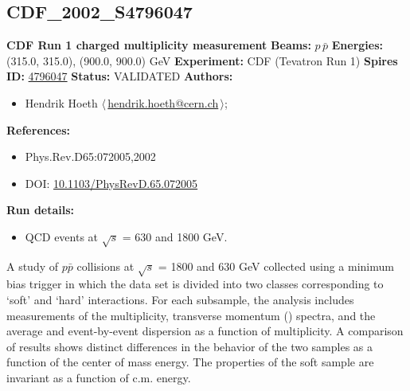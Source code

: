 \clearpage


\clearpage

\subsection[CDF\_2002\_S4796047]{CDF\_2002\_S4796047\,\cite{Acosta:2001rm}}
\textbf{CDF Run 1 charged multiplicity measurement}\newline
\textbf{Beams:} $p$\,$\bar{p}$ \newline
\textbf{Energies:} (315.0, 315.0), (900.0, 900.0) GeV \newline
\textbf{Experiment:} CDF (Tevatron Run 1) \newline
\textbf{Spires ID:} \href{http://www.slac.stanford.edu/spires/find/hep/www?rawcmd=key+4796047}{4796047}\newline
\textbf{Status:} VALIDATED\newline
\textbf{Authors:}
\begin{itemize}
  \item Hendrik Hoeth $\langle\,$\href{mailto:hendrik.hoeth@cern.ch}{hendrik.hoeth@cern.ch}$\,\rangle$;
\end{itemize}
\textbf{References:}
\begin{itemize}
  \item Phys.Rev.D65:072005,2002
  \item DOI: \href{http://dx.doi.org/10.1103/PhysRevD.65.072005}{10.1103/PhysRevD.65.072005}
\end{itemize}
\textbf{Run details:}
\begin{itemize}

  \item QCD events at \ensuremath{\sqrt{s}} = 630 and 1800 GeV.\end{itemize}

\noindent A study of $p\bar{p}$ collisions at \ensuremath{\sqrt{s}} = 1800 and 630 GeV collected using a minimum bias trigger in which the data set is divided into two classes corresponding to `soft' and `hard' interactions. For each subsample, the analysis includes measurements of the multiplicity, transverse momentum (\pT) spectra, and the average \pT and event-by-event \pT dispersion as a function of multiplicity. A comparison of results shows distinct differences in the behavior of the two samples as a function of the center of mass energy. The properties of the soft sample are invariant as a function of c.m. energy.

